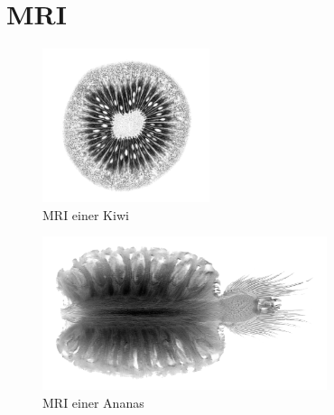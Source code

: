 \chapter{MRI\label{chapter:mri}}
\begin{refsection}

\printbibliography[heading=subbibliography]
\end{refsection}

\begin{minipage}{0.36\textwidth}
	\begin{figure}[H]
		\centering
		\includegraphics[height = 4.5cm]{./mri/pic/Kiwi.png}
		\caption{MRI einer Kiwi \cite{skript:mri:kiwi}}
		\label{mri:abb:kiwi}
	\end{figure}
\end{minipage}
\begin{minipage}{0.64\textwidth}
	\begin{figure}[H]
		\centering
		\includegraphics[height = 4.5cm]{./mri/pic/pinaple.png}
		\caption{MRI einer Ananas \cite{skript:mri:pinaple}}
		\label{mri:abb:ananas}
	\end{figure}
\end{minipage}
\vspace*{5mm}






